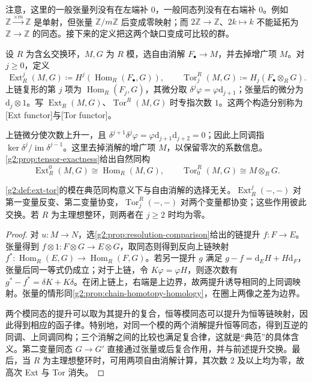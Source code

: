 注意，这里的一般张量列没有在左端补 \(0\)，一般同态列没有在右端补 \(0\)。例如 \(\mathbb Z\xrightarrow{\times m}\mathbb Z\) 是单射，但张量 \(\mathbb Z/m\mathbb Z\) 后变成零映射；而 \(2\mathbb Z\to\mathbb Z\)、\(2k\mapsto k\) 不能延拓为 \(\mathbb Z\to\mathbb Z\) 的同态。接下来的定义把这两个缺口变成可比较的群。

\begin{definition}\label{g2:def:ext-tor}
	设 \(R\) 为含幺交换环，\(M,G\) 为 \(R\) 模，选自由消解 \(F_\bullet\to M\)，并去掉增广项 \(M\)。对 \(j\ge0\)，定义
	\[
		\operatorname{Ext}_R^j(M,G)\coloneqq H^j(\operatorname{Hom}_R(F_\bullet,G)),\qquad
		\operatorname{Tor}^R_j(M,G)\coloneqq H_j(F_\bullet\otimes_R G).
	\]
	上链复形的第 \(j\) 项为 \(\operatorname{Hom}_R(F_j,G)\)，其微分取 \(\delta^j\varphi=\varphi\mathrm{d}_{j+1}\)；张量后的微分为 \(\mathrm{d}_j\otimes1\)。写 \(\operatorname{Ext}_R(M,G)\)、\(\operatorname{Tor}^R(M,G)\) 时专指次数 \(1\)。这两个构造分别称为[Ext functor]与[Tor functor]。
\end{definition}

上链微分使次数上升一，且 \(\delta^{j+1}\delta^j\varphi=\varphi\mathrm{d}_{j+1}\mathrm{d}_{j+2}=0\)；因此上同调指 \(\ker\delta^j/\operatorname{im}\delta^{j-1}\)。这里去掉消解的增广项 \(M\)，以保留零次的系数信息。\cref{g2:prop:tensor-exactness}给出自然同构
\[
	\operatorname{Ext}_R^0(M,G)\cong\operatorname{Hom}_R(M,G),\qquad
	\operatorname{Tor}^R_0(M,G)\cong M\otimes_R G.
\]

\begin{proposition}\label{g2:prop:ext-tor-independence}
	\cref{g2:def:ext-tor}的模在典范同构意义下与自由消解的选择无关。\(\operatorname{Ext}_R^j(-,-)\) 对第一变量反变、第二变量协变，\(\operatorname{Tor}^R_j(-,-)\) 对两个变量都协变；这些作用彼此交换。若 \(R\) 为主理想整环，则两者在 \(j\ge2\) 时均为零。
\end{proposition}
\begin{proof}
	对 \(u:M\to N\)，选\cref{g2:prop:resolution-comparison}给出的链提升 \(f:F\to E\)。张量得到 \(f\otimes1:F\otimes G\to E\otimes G\)，取同态则得到反向上链映射 \(f^*:\operatorname{Hom}_R(E,G)\to\operatorname{Hom}_R(F,G)\)。若另一提升 \(g\) 满足 \(g-f=\mathrm{d}_EH+H\mathrm{d}_F\)，张量后同一等式仍成立；对于上链，令 \(K\varphi=\varphi H\)，则逐次数有 \(g^*-f^*=\delta K+K\delta\)。在闭上链上，右端是上边界，故两提升诱导相同的上同调映射。张量的情形同\cref{g2:prop:chain-homotopy-homology}，在圈上两像之差为边界。

	两个模同态的提升可以取为其提升的复合，恒等模同态可以提升为恒等链映射，因此得到相应的函子律。特别地，对同一个模的两个消解提升恒等同态，得到互逆的同调、上同调同构；三个消解之间的比较也满足复合律，这就是“典范”的具体含义。第二变量同态 \(G\to G'\) 直接通过张量或后复合作用，并与前述提升交换。最后，当 \(R\) 为主理想整环时，可用两项自由消解计算，其次数 \(2\) 及以上均为零，故高次 Ext 与 Tor 消失。
\end{proof}

